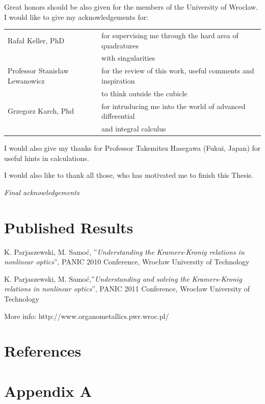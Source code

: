\documentclass[12pt,twoside,a4paper]{article}
\numberwithin{equation}{subsection}
\numberwithin{figure}{subsection}
\begin{document}
Great honors should be also given for the members of the University of Wroclaw. I would like to give my acknowledgements for:


\begin{tabular}{l l}
    Rafał Keller, PhD              & for supervising me through the hard area of quadratures \\
                                   & with singularities \\ 
    Professor Stanisław Lewanowicz & for the review of this work, useful comments and inspiration \\
                                   & to think outside the cubicle \\
    Grzegorz Karch, Phd            & for intruducing me into the world of advanced differential \\
                                   & and integral calculus \\
\end{tabular}

I would also give my thanks for Professor Takemitsu Hasegawa (Fukui, Japan) for useful hints in calculations.

I would also like to thank all those, who has motivated me to finish this Thesis.

\textit{Final acknowledgements}

\section{Published Results} \label{chap:published_results}


K. Parjaszewski, M. Samoć, ''\textit{Understanding the Kramers-Kronig relations in nonlinear optics}'', PANIC 2010 Conference,
Wrocław University of Technology


K. Parjaszewski, M. Samoć,''\textit{Understanding and solving the Kramers-Kronig relations in nonlinear optics}'', PANIC 2011
Conference, Wrocław University of Technology


More info: http://www.organometallics.pwr.wroc.pl/


\section{References}
\nocite{*}




\section*{Appendix A}
\end{document}
